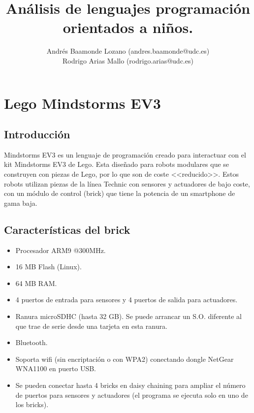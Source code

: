\documentclass[12pt,a4paper]{article}
\title{Análisis de lenguajes programación orientados a niños.}
\author{Andrés Baamonde Lozano (andres.baamonde@udc.es)\\
	Rodrigo Arias Mallo (rodrigo.arias@udc.es)}
\begin{document}
\maketitle

\clearpage 

\tableofcontents

\clearpage 

\section{Lego Mindstorms EV3}

\subsection{Introducción}

Mindstorms EV3 es un lenguaje de programación creado para interactuar con el kit 
Mindstorms EV3 de Lego. Esta diseñado para robots modulares que se construyen 
con piezas de Lego, por lo que son de coste <<reducido>>. Estos robots utilizan 
piezas de la línea Technic con sensores y actuadores de bajo coste, con un 
módulo de control (brick) que tiene la potencia de un smartphone de gama baja.

\subsection{Características del brick}

\begin{itemize}
\item Procesador ARM9 @300MHz.
\item 16 MB Flash (Linux).
\item 64 MB RAM.
\item 4 puertos de entrada para sensores y 4 puertos de salida para actuadores.
\item Ranura microSDHC (hasta 32 GB). Se puede arrancar un S.O. diferente al que
trae de serie desde una tarjeta en esta ranura.
\item Bluetooth.
\item Soporta wifi (sin encriptación o con WPA2) conectando dongle NetGear
WNA1100 en puerto USB.
\item Se pueden conectar hasta 4 bricks en daisy chaining para ampliar el número
de puertos para sensores y actuadores (el programa se ejecuta solo en uno de los
bricks).
\end{itemize}
\end{document}
